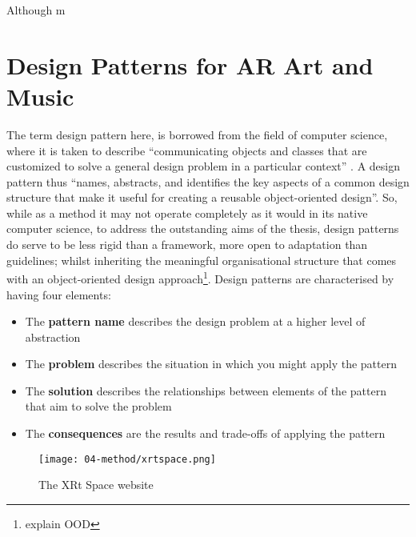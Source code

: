 Although m





\section{Design Patterns for AR Art and Music} \label{sec: method-patterns} %

The term design pattern here, is borrowed from the field of computer science, where it is taken to describe ``communicating objects and classes that are customized to solve a general design problem in a particular context'' \citep{gamma1995}. A design pattern thus ``names, abstracts, and identifies the key aspects of a common design structure that make it useful for creating a reusable object-oriented design''. So, while as a method it may not operate completely as it would in its native computer science, to address the outstanding aims of the thesis, design patterns do serve to be less rigid than a framework, more open to adaptation than guidelines; whilst inheriting the meaningful organisational structure that comes with an object-oriented design approach\footnote{explain OOD}. Design patterns are characterised by having four elements:
\begin{itemize}
    \item The \textbf{pattern name} describes the design problem at a higher level of abstraction
    \item The \textbf{problem} describes the situation in which you might apply the pattern
    \item The \textbf{solution} describes the relationships between elements of the pattern that aim to solve the problem
    \item The \textbf{consequences} are the results and trade-offs of applying the pattern
\end{itemize}

\begin{figure}
    \centering
    {\texttt{[image: 04-method/xrtspace.png]}}
    \caption[The XRt Space website]{The XRt Space website}
\end{figure}\label{fig: thexrtspace}

